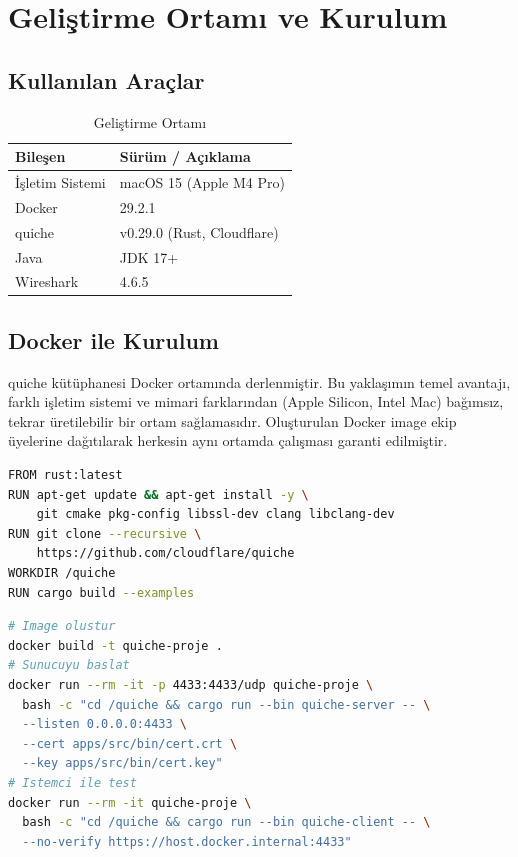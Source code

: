 \documentclass[12pt,a4paper]{article}
\begin{document}
\section{Geliştirme Ortamı ve Kurulum}
\subsection{Kullanılan Araçlar}
\begin{table}[H]
  \centering
  \caption{Geliştirme Ortamı}
  \begin{tabular}{ll}
    \toprule
    \textbf{Bileşen} & \textbf{Sürüm / Açıklama}   \\
    \midrule
    İşletim Sistemi  & macOS 15 (Apple M4 Pro)      \\
    Docker           & 29.2.1                       \\
    quiche           & v0.29.0 (Rust, Cloudflare)  \\
    Java             & JDK 17+                      \\
    Wireshark        & 4.6.5                        \\
    \bottomrule
  \end{tabular}
\end{table}
\subsection{Docker ile Kurulum}
quiche kütüphanesi Docker ortamında derlenmiştir. Bu yaklaşımın
temel avantajı, farklı işletim sistemi ve mimari farklarından
(Apple Silicon, Intel Mac) bağımsız, tekrar üretilebilir bir
ortam sağlamasıdır. Oluşturulan Docker image ekip üyelerine
dağıtılarak herkesin aynı ortamda çalışması garanti edilmiştir.
\begin{lstlisting}[language=bash, caption={Dockerfile}]
FROM rust:latest
RUN apt-get update && apt-get install -y \
    git cmake pkg-config libssl-dev clang libclang-dev
RUN git clone --recursive \
    https://github.com/cloudflare/quiche
WORKDIR /quiche
RUN cargo build --examples
\end{lstlisting}
\begin{lstlisting}[language=bash, caption={Image oluşturma ve sunucu başlatma}]
# Image olustur
docker build -t quiche-proje .
# Sunucuyu baslat
docker run --rm -it -p 4433:4433/udp quiche-proje \
  bash -c "cd /quiche && cargo run --bin quiche-server -- \
  --listen 0.0.0.0:4433 \
  --cert apps/src/bin/cert.crt \
  --key apps/src/bin/cert.key"
# Istemci ile test
docker run --rm -it quiche-proje \
  bash -c "cd /quiche && cargo run --bin quiche-client -- \
  --no-verify https://host.docker.internal:4433"
\end{lstlisting}
\end{document}
